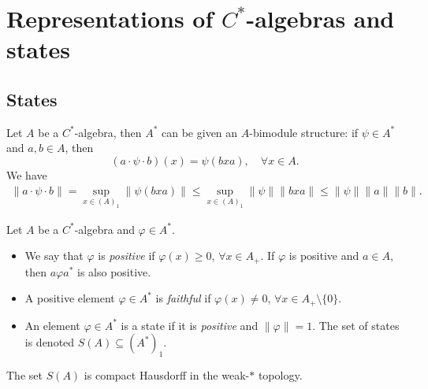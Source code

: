 \section{Representations of $C^*$-algebras and states}

\subsection{States}

Let $A$ be a $C^*$-algebra, then $A^*$ can be given an $A$-bimodule 
structure: if $\psi \in A^*$ and $a, b \in A$, then 
$$(a \cdot \psi \cdot b)(x) = \psi(bxa),\quad \forall x \in A.$$
We have 
\begin{align*}
  \| a \cdot \psi \cdot b\| = \sup_{x \in (A)_1} \| \psi (bxa)\| \leq \sup_{x \in (A)_1} \| \psi \| \|bxa\| \leq \| \psi\| \| a\| \|b\|.
\end{align*}

\begin{definition}
  Let $A$ be a $C^*$-algebra and $\varphi \in A^*$.
  \begin{itemize}
    \item We say that $\varphi$ is \emph{positive} if $\varphi(x) \geq 0$, $\forall x \in A_+$.
    If $\varphi$ is positive and $a \in A$, then $a \varphi a^*$ is also positive.
    \item A positive element $\varphi \in A^*$ is \emph{faithful} if $\varphi(x) \neq 0$, $\forall x \in A_+ \setminus \{0\}$.
    \item An element $\varphi \in A^*$ is a state if it is \emph{positive} and $\| \varphi \| = 1$.
    The set of states is denoted $S(A) \subseteq (A^*)_1$.
  \end{itemize}
\end{definition}

\begin{remark}
  The set $S(A)$ is compact Hausdorff in the weak-$*$ topology.
\end{remark}

